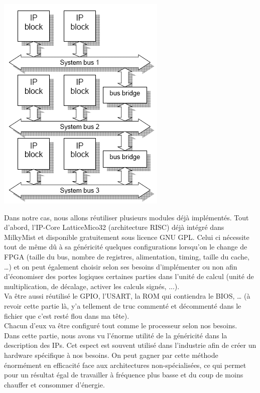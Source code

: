 \begin{center}
\includegraphics[scale=0.4]{soc_interconnect.png}
\end{center}

Dans notre cas, nous allons réutiliser plusieurs modules déjà implémentés. Tout d'abord, l'IP-Core LatticeMico32 (architecture RISC) déjà intégré dans MilkyMist et disponible gratuitement sous licence GNU GPL. Celui ci nécessite tout de même dû à sa généricité quelques configurations lorsqu'on le change de FPGA (taille du bus, nombre de registres, alimentation, timing, taille du cache, …) et on peut également choisir selon ses besoins d'implémenter ou non afin d'économiser des portes logiques certaines parties dans l'unité de calcul (unité de multiplication, de décalage, activer les calculs signés, ...).\\

Va être aussi réutilisé le GPIO, l'USART, la ROM qui contiendra le BIOS, … (à revoir cette partie là, y'a tellement de truc commenté et décommenté dans le fichier que c'est resté flou dans ma tête).\\

Chacun d'eux va être configuré tout comme le processeur selon nos besoins.\\

Dans cette partie, nous avons vu l'énorme utilité de la généricité dans la description des IPs. Cet espect est souvent utilisé dans l'industrie afin de créer un hardware spécifique à nos besoins. On peut gagner par cette méthode énormément en efficacité face aux architectures non-spécialisées, ce qui permet pour un résultat égal de travailler à fréquence plus basse et du coup de moins chauffer et consommer d'énergie.\\